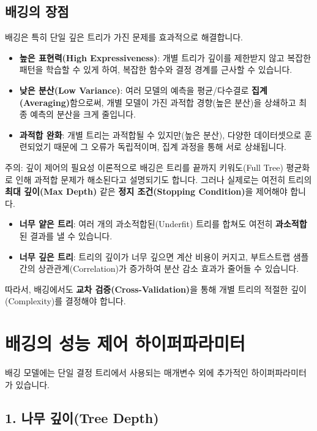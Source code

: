 \documentclass[11pt,a4paper]{book}
\theoremstyle{definition}
\begin{document}
\subsection{배깅의 장점}
배깅은 특히 단일 깊은 트리가 가진 문제를 효과적으로 해결합니다.

\begin{itemize}
    \item \textbf{높은 표현력(High Expressiveness)}: 개별 트리가 깊이를 제한받지 않고 복잡한 패턴을 학습할 수 있게 하여, 복잡한 함수와 결정 경계를 근사할 수 있습니다.
    \item \textbf{낮은 분산(Low Variance)}: 여러 모델의 예측을 평균/다수결로 \textbf{집계(Averaging)}함으로써, 개별 모델이 가진 과적합 경향(높은 분산)을 상쇄하고 최종 예측의 분산을 크게 줄입니다.
    \item \textbf{과적합 완화}: 개별 트리는 과적합될 수 있지만(높은 분산), 다양한 데이터셋으로 훈련되었기 때문에 그 오류가 독립적이며, 집계 과정을 통해 서로 상쇄됩니다.
\end{itemize}

\begin{cautionbox}{주의: 깊이 제어의 필요성}
이론적으로 배깅은 트리를 끝까지 키워도(Full Tree) 평균화로 인해 과적합 문제가 해소된다고 설명되기도 합니다.
그러나 실제로는 여전히 트리의 \textbf{최대 깊이(Max Depth)} 같은 \textbf{정지 조건(Stopping Condition)}을 제어해야 합니다.
\begin{itemize}
    \item \textbf{너무 얕은 트리}: 여러 개의 과소적합된(Underfit) 트리를 합쳐도 여전히 \textbf{과소적합}된 결과를 낼 수 있습니다.
    \item \textbf{너무 깊은 트리}: 트리의 깊이가 너무 깊으면 계산 비용이 커지고, 부트스트랩 샘플 간의 상관관계(Correlation)가 증가하여 분산 감소 효과가 줄어들 수 있습니다.
\end{itemize}
따라서, 배깅에서도 \textbf{교차 검증(Cross-Validation)}을 통해 개별 트리의 적절한 깊이(Complexity)를 결정해야 합니다.
\end{cautionbox}


\section{배깅의 성능 제어 하이퍼파라미터}
\label{sec:hyperparameters}

배깅 모델에는 단일 결정 트리에서 사용되는 매개변수 외에 추가적인 하이퍼파라미터가 있습니다.

\subsection{1. 나무 깊이(Tree Depth)}
\end{document}
